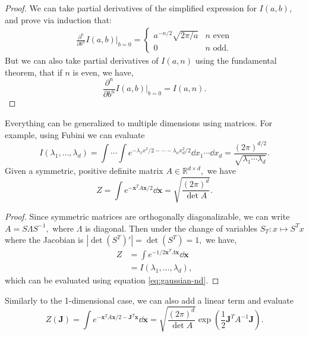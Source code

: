 \documentclass{article}
\numberwithin{equation}{section}
\begin{document}
\begin{proof}
    We can take partial derivatives of the simplified expression for $I(a,b)$, and prove via induction that:
    \begin{align}
        \frac{\partial^n}{\partial b^n}I(a,b)\bigg|_{b=0} = \begin{cases}
            a^{-n/2}\sqrt{2\pi/a} & n \text{ even} \\
            0 & n \text{ odd}.
        \end{cases}
    \end{align}
    But we can also take partial derivatives of $I(a,n)$ using the fundamental theorem, that if $n$ is even, we have,
    \begin{equation}
        \frac{\partial^n}{\partial b^n}I(a,b)\bigg|_{b=0} = I(a,n).
    \end{equation}
\end{proof}
Everything can be generalized to multiple dimensions using matrices. For example, using Fubini we can evaluate 
\begin{equation}
    \boxed{I(\lambda_1,\dots,\lambda_d) = \int\cdots \int e^{-\lambda_1x^2/2-\cdots -\lambda_nx_d^2/2}\dd{x_1}\cdots\dd{x_d} = \frac{(2\pi)^{d/2}}{\sqrt{\lambda_1\cdots\lambda_d}}.}
\end{equation}
Given a symmetric, positive definite matrix $A \in \mathbb{R}^{d\times d},$ we have 
\begin{equation}
    \boxed{Z = \int e^{-\bm{x}^T A \bm{x}/2} \dd{\bm{x}} = \sqrt{\frac{(2\pi)^d}{\det A}}.}
    \label{eq:gaussian-nd}
\end{equation}
\begin{proof}
    Since symmetric matrices are orthogonally diagonalizable, we can write $A=S\Lambda S^{-1},$ where $\Lambda$ is diagonal. Then under the change of variables $S_T:x \mapsto S^Tx$ where the Jacobian is $|\det (S^T)'| = \det (S^T) = 1,$ we have,
    \begin{align}
        Z &= \int e^{-1/2 \bm{x}^T \Lambda \bm{x}} \dd{\bm{x}} \\ 
        &= I(\lambda_1,\dots,\lambda_d),
    \end{align}
    which can be evaluated using equation \ref{eq:gaussian-nd}.
\end{proof}
Similarly to the 1-dimensional case, we can also add a linear term and evaluate 
\begin{equation}
    \boxed{Z(\bm{J}) = \int e^{-\bm{x}^TA\bm{x}/2 - \bm{J}^T\bm{x}}\dd{\bm{x}} = \sqrt{\frac{(2\pi)^d}{\det A}}\exp\left(\frac{1}{2}\bm{J}^TA^{-1}\bm{J}\right)}.
\end{equation}
\end{document}
